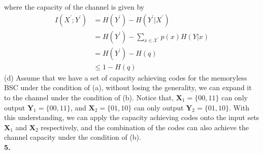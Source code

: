 \documentclass[12pt]{article}
\begin{document}
	where the capacity of the channel is given by 
	\begin{align*}
		I(X^\prime;Y^\prime) &= H(Y^\prime) - H(Y^\prime|X^\prime) \\
							 &= H(Y^\prime) - \sum_{x\in\mathcal{X}^\prime}p(x)H(Y|x) \\
							 &= H(Y^\prime) - H(q) \\
							 &\leq 1 - H(q) 
	\end{align*}
	(d) Assume that we have a set of capacity achieving codes for the memoryless BSC under the condition of (a), without losing the generality, we can expand it to the channel under the condition of (b). Notice that, $ \mathbf{X}_1 = \{00, 11\} $ can only output $ \mathbf{Y}_1 = \{00, 11\} $, and $\mathbf{X}_2 = \{01, 10\}$ can only output $\mathbf{Y}_2 = \{01, 10\}$. With this understanding, we can apply the capacity achieving codes onto the input sets $\mathbf{X}_1$ and $ \mathbf{X}_2 $ respectively, and the combination of the codes can also achieve the channel capacity under the condition of (b). \\
	
	\textbf{5.}
\end{document}
